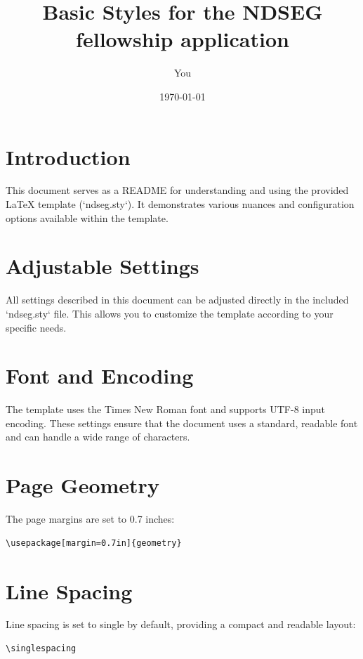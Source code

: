 \documentclass{article}
\begin{document}
\title{Basic Styles for the NDSEG fellowship application}
\author{You}
\date{\today}
\maketitle

\section{Introduction}
This document serves as a README for understanding and using the provided LaTeX template (`ndseg.sty`). It demonstrates various nuances and configuration options available within the template.

\section{Adjustable Settings}
All settings described in this document can be adjusted directly in the included `ndseg.sty` file. This allows you to customize the template according to your specific needs.

\section{Font and Encoding}
The template uses the Times New Roman font and supports UTF-8 input encoding. These settings ensure that the document uses a standard, readable font and can handle a wide range of characters.

\section{Page Geometry}
The page margins are set to 0.7 inches:
\begin{verbatim}
\usepackage[margin=0.7in]{geometry}
\end{verbatim}

\section{Line Spacing}
Line spacing is set to single by default, providing a compact and readable layout:
\begin{verbatim}
\singlespacing
\end{verbatim}
\end{document}
